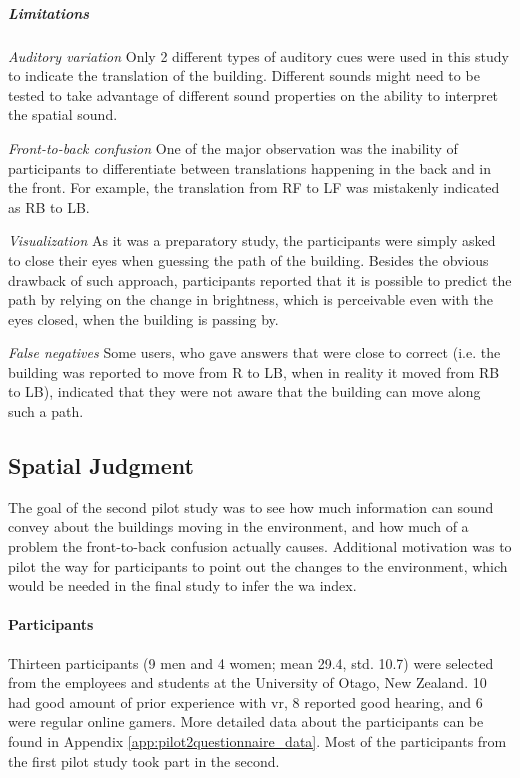 \subparagraph{Limitations} 
\textit{Auditory variation} Only 2 different types of auditory cues were used in this study to indicate the translation of the building. Different sounds might need to be tested to take advantage of different sound properties on the ability to interpret the spatial sound. 

\textit{Front-to-back confusion} One of the major observation was the inability of participants to differentiate between translations happening in the back and in the front. For example, the translation from RF to LF was mistakenly indicated as RB to LB.

\textit{Visualization} As it was a preparatory study, the participants were simply asked to close their eyes when guessing the path of the building. Besides the obvious drawback of such approach, participants reported that it is possible to predict the path by relying on the change in brightness, which is perceivable even with the eyes closed, when the building is passing by.

\textit{False negatives} Some users, who gave answers that were close to correct (i.e. the building was reported to move from R to LB, when in reality it moved from RB to LB), indicated that they were not aware that the building can move along such a path. 












\subsection{Spatial Judgment}
\label{study_two}
The goal of the second pilot study was to see how much information can sound convey about the buildings moving in the environment, and how much of a problem the front-to-back confusion actually causes. Additional motivation was to pilot the way for participants to point out the changes to the environment, which would be needed in the final study to infer the \gls{wa} index. 

\paragraph{Participants}
Thirteen participants (9 men and 4 women; mean 29.4, std. 10.7) were selected from the employees and students at the University of Otago, New Zealand. 10 had good amount of prior experience with \gls{vr}, 8 reported good hearing, and 6 were regular online gamers. More detailed data about the participants can be found in Appendix \ref{app:pilot2questionnaire_data}. Most of the participants from the first pilot study took part in the second.

